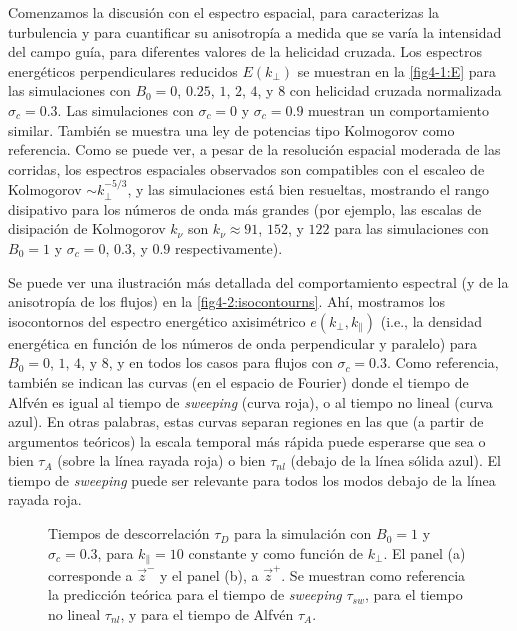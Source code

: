 Comenzamos la discusión con el espectro espacial, para caracterizas la
turbulencia y para cuantificar su anisotropía a medida que se varía la
intensidad del campo guía, para diferentes valores de la helicidad
cruzada.  Los espectros energéticos perpendiculares reducidos
$E(k_\perp)$ se muestran en la \cref{fig4-1:E} para las simulaciones con
$B_0=0$, $0.25$, $1$, $2$, $4$, y $8$ con helicidad cruzada
normalizada $\sigma_c=0.3$. Las simulaciones con $\sigma_c=0$ y
$\sigma_c=0.9$ muestran un comportamiento similar.  También se muestra
una ley de potencias tipo Kolmogorov como referencia. Como se puede
ver, a pesar de la resolución espacial moderada de las corridas, los
espectros espaciales observados son compatibles con el escaleo de
Kolmogorov $\sim k_\perp^{-5/3}$, y las simulaciones está bien
resueltas, mostrando el rango disipativo para los números de onda más
grandes (por ejemplo, las escalas de disipación de Kolmogorov $k_\nu$
son $k_\nu \approx 91$, $152$, y $122$ para las simulaciones con
$B_0 = 1$ y $\sigma_c = 0$, $0.3$, y $0.9$ respectivamente).

Se puede ver una ilustración más detallada del comportamiento
espectral (y de la anisotropía de los flujos) en la
\cref{fig4-2:isocontourns}. Ahí, mostramos los isocontornos del espectro
energético axisimétrico $e(k_\perp, k_\parallel)$ (i.e., la densidad
energética en función de los números de onda perpendicular y paralelo)
para $B_0=0$, $1$, $4$, y $8$, y en todos los casos para flujos con
$\sigma_c = 0.3$. Como referencia, también se indican las curvas (en
el espacio de Fourier) donde el tiempo de Alfvén es igual al tiempo
de \textit{sweeping} (curva roja), o al tiempo no lineal (curva
azul). En otras palabras, estas curvas separan regiones en las que (a
partir de argumentos teóricos) la escala temporal más rápida puede
esperarse que sea o bien $\tau_A$ (sobre la línea rayada roja) o bien
$\tau_{nl}$ (debajo de la línea sólida azul). El tiempo
de \textit{sweeping} puede ser relevante para todos los modos debajo
de la línea rayada roja.

\begin{figure}
  \centering
  \caption{Tiempos de descorrelación $\tau_D$ para la simulación con $B_0=1$ y $\sigma_c=0.3$, para $k_\parallel=10$ constante y como función de $k_\perp$. El panel (a) corresponde a $\vec{z}^-$ y el panel (b), a $\vec{z}^+$. Se muestran como referencia la predicción teórica para el tiempo de \textit{sweeping} $\tau_{sw}$, para el tiempo no lineal $\tau_{nl}$, y para el tiempo de Alfv\'en $\tau_A$.}
  \label{fig4-5:z+_vs_z-}
\end{figure}

